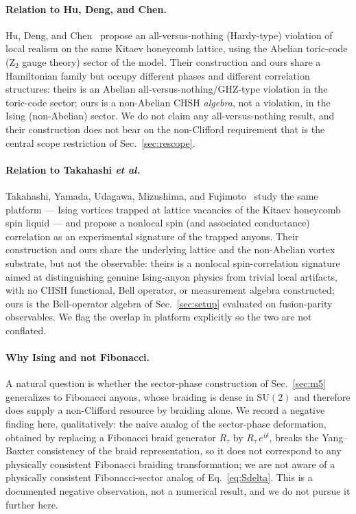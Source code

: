 \documentclass[aps,pra,twocolumn,superscriptaddress,floatfix,nofootinbib]{revtex4-2}
\begin{document}
\paragraph{Relation to Hu, Deng, and Chen.} Hu, Deng, and
Chen~\cite{HuDengChen2009} propose an all-versus-nothing (Hardy-type)
violation of local realism on the same Kitaev honeycomb lattice,
using the Abelian toric-code (Z$_2$ gauge theory) sector of the model.
Their construction and ours share a Hamiltonian family but occupy
different phases and different correlation structures: theirs is an
Abelian all-versus-nothing/GHZ-type violation in the toric-code
sector; ours is a non-Abelian CHSH \emph{algebra}, not a violation, in
the Ising (non-Abelian) sector. We do not claim any all-versus-nothing
result, and their construction does not bear on the non-Clifford
requirement that is the central scope restriction of Sec.~\ref{sec:rescope}.

\paragraph{Relation to Takahashi \emph{et al.}} Takahashi, Yamada,
Udagawa, Mizushima, and Fujimoto~\cite{Takahashi2022} study the same
platform --- Ising vortices trapped at lattice vacancies of the
Kitaev honeycomb spin liquid --- and propose a nonlocal spin (and
associated conductance) correlation as an experimental signature of
the trapped anyons. Their construction and ours share the underlying
lattice and the non-Abelian vortex substrate, but not the observable:
theirs is a nonlocal spin-correlation signature aimed at
distinguishing genuine Ising-anyon physics from trivial local
artifacts, with no CHSH functional, Bell operator, or measurement
algebra constructed; ours is the Bell-operator algebra of
Sec.~\ref{sec:setup} evaluated on fusion-parity observables. We flag
the overlap in platform explicitly so the two are not conflated.

\paragraph{Why Ising and not Fibonacci.} A natural question is whether
the sector-phase construction of Sec.~\ref{sec:m5} generalizes to
Fibonacci anyons, whose braiding is dense in $\mathrm{SU}(2)$ and
therefore does supply a non-Clifford resource by braiding alone. We
record a negative finding here, qualitatively: the naive analog of the
sector-phase deformation, obtained by replacing a Fibonacci braid
generator $R_\tau$ by $R_\tau\,e^{i\delta}$, breaks the Yang--Baxter
consistency of the braid representation, so it does not correspond to
any physically consistent Fibonacci braiding transformation; we are
not aware of a physically consistent Fibonacci-sector analog of
Eq.~\eqref{eq:Sdelta}. This is a documented negative observation, not
a numerical result, and we do not pursue it further here.
\end{document}
